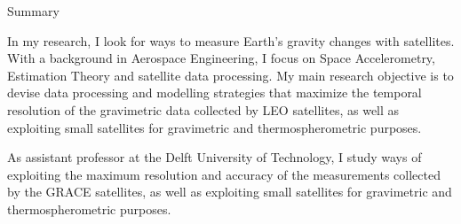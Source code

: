 
\begin{cvtext}{Summary}





In my research, I look for ways to measure Earth's gravity changes with satellites.
With a background in Aerospace Engineering, I focus on Space Accelerometry, Estimation Theory and satellite data processing.
My main research objective is to devise data processing and modelling strategies that maximize the temporal resolution of the gravimetric data collected by LEO satellites, as well as exploiting small satellites for gravimetric and thermospherometric purposes.

As assistant professor at the Delft University of Technology, I study ways of exploiting the maximum resolution and accuracy of the measurements collected by the \ac{GRACE} satellites, as well as exploiting small satellites for gravimetric and thermospherometric purposes.


\end{cvtext}

